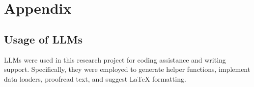 \appendix
\section{Appendix}
\subsection{Usage of LLMs}
LLMs were used in this research project for coding assistance and writing support. Specifically, they were employed to generate helper functions, implement data loaders, proofread text, and suggest \LaTeX{} formatting.
